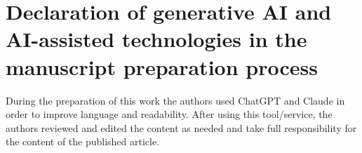\documentclass[preprint, 11pt, authoryear]{elsarticle}
\begin{document}
\section*{Declaration of generative AI and AI-assisted technologies in the manuscript preparation process}

During the preparation of this work the authors used ChatGPT and Claude in order to improve language and readability. After using this tool/service, the authors reviewed and edited the content as needed and take full responsibility for the content of the published article.



 



\newpage







\end{document}
